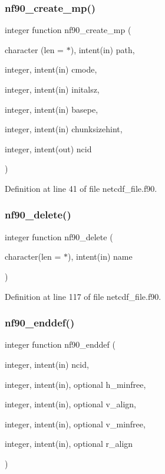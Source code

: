 \subsubsection{\texorpdfstring{nf90\+\_\+create\+\_\+mp()}{nf90\_create\_mp()}}
{\footnotesize\ttfamily integer function nf90\+\_\+create\+\_\+mp (\begin{DoxyParamCaption}\item[{character (len = $\ast$), intent(in)}]{path,  }\item[{integer, intent(in)}]{cmode,  }\item[{integer, intent(in)}]{initalsz,  }\item[{integer, intent(in)}]{basepe,  }\item[{integer, intent(in)}]{chunksizehint,  }\item[{integer, intent(out)}]{ncid }\end{DoxyParamCaption})}



Definition at line 41 of file netcdf\+\_\+file.\+f90.

\mbox{\label{netcdf__file_8f90_a98182625d66975384a518ce43f3a3f5f}} 
\subsubsection{\texorpdfstring{nf90\+\_\+delete()}{nf90\_delete()}}
{\footnotesize\ttfamily integer function nf90\+\_\+delete (\begin{DoxyParamCaption}\item[{character(len = $\ast$), intent(in)}]{name }\end{DoxyParamCaption})}



Definition at line 117 of file netcdf\+\_\+file.\+f90.

\mbox{\label{netcdf__file_8f90_a76e8ac5f28d4098c6e8a79edae2879c7}} 
\subsubsection{\texorpdfstring{nf90\+\_\+enddef()}{nf90\_enddef()}}
{\footnotesize\ttfamily integer function nf90\+\_\+enddef (\begin{DoxyParamCaption}\item[{integer, intent(in)}]{ncid,  }\item[{integer, intent(in), optional}]{h\+\_\+minfree,  }\item[{integer, intent(in), optional}]{v\+\_\+align,  }\item[{integer, intent(in), optional}]{v\+\_\+minfree,  }\item[{integer, intent(in), optional}]{r\+\_\+align }\end{DoxyParamCaption})}



